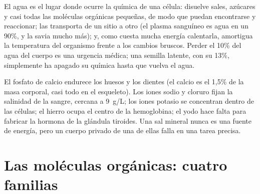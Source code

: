 \begin{proposition}\label{prop:g10:chemistry-of-life:water-roles}
El agua es el lugar donde ocurre la química de una célula: disuelve
sales, azúcares y casi todas las moléculas orgánicas pequeñas, de modo
que puedan encontrarse y reaccionar; las transporta de un sitio a otro
(el plasma sanguíneo es agua en un 90\%, y la savia mucho más); y,
como cuesta mucha energía calentarla, amortigua la temperatura del
organismo frente a los cambios bruscos. Perder el 10\% del agua del
cuerpo es una urgencia médica; una semilla latente, con su 13\%,
simplemente ha apagado su química hasta que vuelva el agua.
\end{proposition}
\admitted

\begin{example}\label{ex:g10:chemistry-of-life:salts}
El fosfato de calcio endurece los huesos y los dientes (el calcio es el
1,5\% de la masa corporal, casi todo en el esqueleto). Los iones sodio
y cloruro fijan la salinidad de la sangre, cercana a \qty{9}{g/L}; los
iones potasio se concentran dentro de las células; el hierro ocupa el
centro de la hemoglobina; el yodo hace falta para fabricar la hormona
de la glándula tiroides. Una sal mineral nunca es una fuente de
energía, pero un cuerpo privado de una de ellas falla en una tarea
precisa.
\end{example}

\section{Las moléculas orgánicas: cuatro familias}

